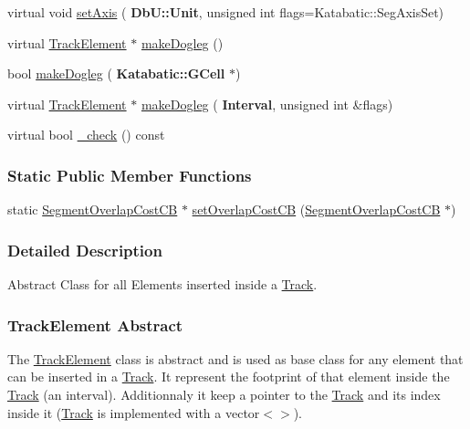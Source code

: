 \begin{DoxyCompactItemize}
virtual void \hyperlink{classKite_1_1TrackElement_a45e685b1e3ee630d24bf43746553af4c}{set\+Axis} (\textbf{ Db\+U\+::\+Unit}, unsigned int flags=Katabatic\+::\+Seg\+Axis\+Set)
\item 
virtual \hyperlink{classKite_1_1TrackElement}{Track\+Element} $\ast$ \hyperlink{classKite_1_1TrackElement_a7a9637875364e84e6862de0102341715}{make\+Dogleg} ()
\item 
bool \hyperlink{classKite_1_1TrackElement_a3e1b4982a2427f74e55592520ab6272d}{make\+Dogleg} (\textbf{ Katabatic\+::\+G\+Cell} $\ast$)
\item 
virtual \hyperlink{classKite_1_1TrackElement}{Track\+Element} $\ast$ \hyperlink{classKite_1_1TrackElement_a524f1569b2f2c1a84df2fe47e84e28ed}{make\+Dogleg} (\textbf{ Interval}, unsigned int \&flags)
\item 
virtual bool \hyperlink{classKite_1_1TrackElement_ad79f4c6ea0fe1135b8264a29af085909}{\+\_\+check} () const
\end{DoxyCompactItemize}
\subsubsection*{Static Public Member Functions}
\begin{DoxyCompactItemize}
\item 
static \hyperlink{namespaceKite_ac86883c8d5a0f34ab9b4ec6eaaad6c9f}{Segment\+Overlap\+Cost\+CB} $\ast$ \hyperlink{classKite_1_1TrackElement_a4648fa47d0870cf743436ff6a6239fd9}{set\+Overlap\+Cost\+CB} (\hyperlink{namespaceKite_ac86883c8d5a0f34ab9b4ec6eaaad6c9f}{Segment\+Overlap\+Cost\+CB} $\ast$)
\end{DoxyCompactItemize}


\subsubsection{Detailed Description}
Abstract Class for all Elements inserted inside a \hyperlink{classKite_1_1Track}{Track}. 

\hypertarget{classKite_1_1TrackElement_secTrackElementAbstract}{}\subsubsection{Track\+Element Abstract}\label{classKite_1_1TrackElement_secTrackElementAbstract}
The \hyperlink{classKite_1_1TrackElement}{Track\+Element} class is abstract and is used as base class for any element that can be inserted in a \hyperlink{classKite_1_1Track}{Track}. It represent the footprint of that element inside the \hyperlink{classKite_1_1Track}{Track} (an interval). Additionnaly it keep a pointer to the \hyperlink{classKite_1_1Track}{Track} and it\textquotesingle{}s index inside it (\hyperlink{classKite_1_1Track}{Track} is implemented with a {\ttfamily vector$<$$>$}).

